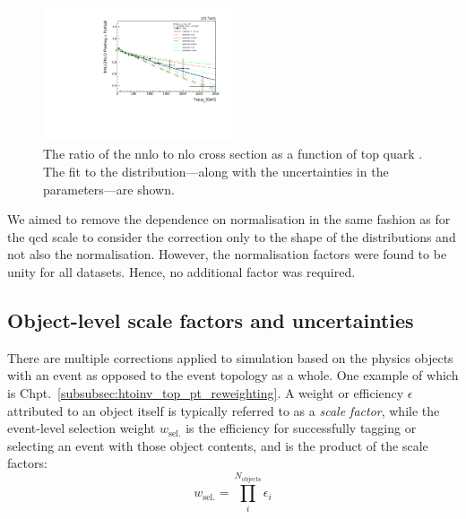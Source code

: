 \begin{figure}[htbp]
    \centering
    \includegraphics[width=0.5\textwidth]{figures/top_pt_reweighting/top_pt_reweighting_central.pdf}
    \caption[The ratio of the NNLO to NLO \ttbar cross section as a function of top quark \pt. The fit to the distribution---along with the uncertainties in the parameters---are shown]{The ratio of the \acrshort{nnlo} to \acrshort{nlo} \ttbar cross section as a function of top quark \pt. The fit to the distribution---along with the uncertainties in the parameters---are shown.}
    \label{fig:top_pt_reweighting}
\end{figure}

We aimed to remove the dependence on normalisation in the same fashion as for the \acrshort{qcd} scale to consider the correction only to the shape of the distributions and not also the normalisation. However, the normalisation factors were found to be unity for all datasets. Hence, no additional factor was required.





\subsection{Object-level scale factors and uncertainties}
\label{subsec:htoinv_SFs_systs_objects}

There are multiple corrections applied to simulation based on the physics objects with an event as opposed to the event topology as a whole. One example of which is Chpt.~\ref{subsubsec:htoinv_top_pt_reweighting}. A weight or efficiency $\epsilon$ attributed to an object itself is typically referred to as a \emph{scale factor}, while the event-level selection weight $w_{\mathrm{sel.}}$ is the efficiency for successfully tagging or selecting an event with those object contents, and is the product of the scale factors:
\begin{equation}
    w_{\mathrm{sel.}} = \prod_i^{N_\mathrm{objects}} \epsilon_i
    \label{eq:event_selection_weight}
\end{equation}


